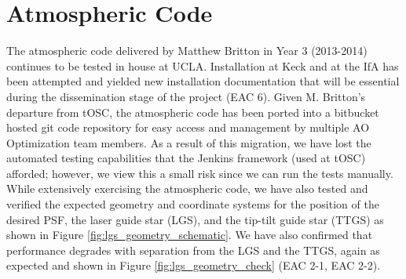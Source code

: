 \section{Atmospheric Code}
\label{ref:atmospheric_code}

The atmospheric code delivered by Matthew Britton in Year 3 (2013-2014) continues to be tested in house at UCLA. Installation at Keck and at the IfA has been attempted and yielded new installation documentation that will be essential during the dissemination stage of the project (EAC 6). Given M. Britton’s departure from tOSC, the atmospheric code has been ported into a bitbucket hosted git code repository for easy access and management by multiple AO Optimization team members. As a result of this migration, we have lost the automated testing capabilities that the Jenkins framework (used at tOSC) afforded; however, we view this a small risk since we can run the tests manually. While extensively exercising the atmospheric code, we have also tested and verified the expected geometry and coordinate systems for the position of the desired PSF, the laser guide star (LGS), and the tip-tilt guide star (TTGS) as shown in Figure \ref{fig:lgs_geometry_schematic}. We have also confirmed that performance degrades with separation from the LGS and the TTGS, again as expected and shown in Figure \ref{fig:lgs_geometry_check} (EAC 2-1, EAC 2-2).

